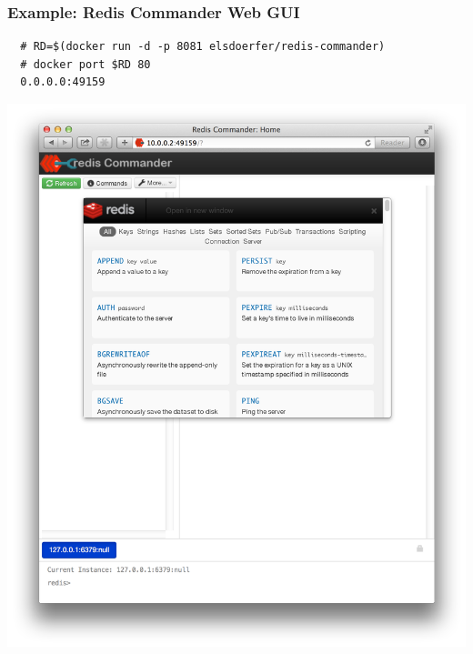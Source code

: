 \documentclass[xcolor=dvipsnames]{beamer}
\begin{document}
\begin{frame}[fragile]
  \frametitle{Example: Redis Commander Web GUI}
  \begin{lstlisting}
  # RD=$(docker run -d -p 8081 elsdoerfer/redis-commander)
  # docker port $RD 80
  0.0.0.0:49159
  \end{lstlisting}
  \includegraphics[width=\textwidth]{figures/redis-commander.pdf}
\end{frame}
\end{document}
